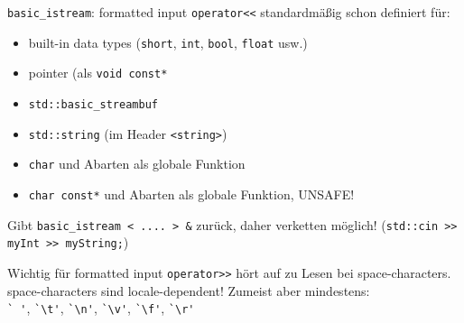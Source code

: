 \begin{frame}[fragile]{\texttt{basic\_istream}: formatted input}
	\texttt{operator<<} standardmäßig schon definiert für:
	\begin{itemize}
		\item built-in data types (\texttt{short}, \texttt{int}, \texttt{bool}, \texttt{float} usw.)
		\item pointer (als \texttt{void const*}
		\item \texttt{std::basic\_streambuf}
		\item \texttt{std::string} (im Header \texttt{<string>})
		\item \texttt{char} und Abarten als globale Funktion
		\item \alert{\texttt{char const*} und Abarten als globale Funktion, UNSAFE!}
	\end{itemize}
	Gibt \texttt{basic\_istream < .... > \&} zurück, daher verketten möglich! (\texttt{std::cin >> myInt >> myString;})
	
	\pause
	\vspace{1em}
	
	\begin{block}{Wichtig für formatted input}
		\texttt{operator>>} hört auf zu Lesen bei space-characters.
		space-characters sind locale-dependent! Zumeist aber mindestens:\\
		\verb|` '|, \verb|`\t'|, \verb|`\n'|, \verb|`\v'|, \verb|`\f'|, \verb|`\r'|
	\end{block}
\end{frame}

